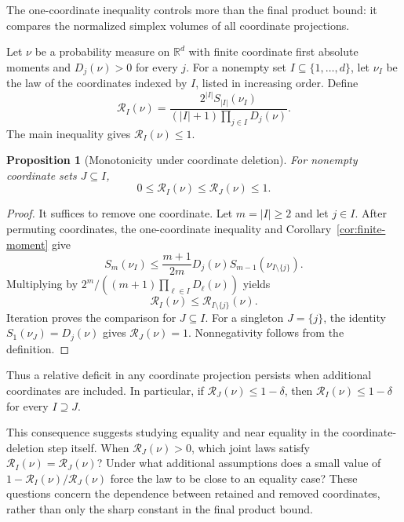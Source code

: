 \documentclass[11pt]{article}
\newtheorem{proposition}[theorem]{Proposition}
\theoremstyle{remark}
\newcommand{\R}{\mathbb{R}}
\begin{document}
\begin{humanblock}

The one-coordinate inequality controls more than the final
product bound: it compares the normalized simplex volumes
of all coordinate projections.

Let $\nu$ be a probability measure on $\R^d$ with finite
coordinate first absolute moments and $D_j(\nu)>0$ for
every $j$. For a nonempty set
$I\subseteq\{1,\ldots,d\}$, let $\nu_I$ be the law of the
coordinates indexed by $I$, listed in increasing order.
Define
$$
\mathcal{R}_I(\nu)=
\frac{2^{|I|}S_{|I|}(\nu_I)}
{(|I|+1)\prod_{j\in I}D_j(\nu)}.
$$
The main inequality gives $\mathcal{R}_I(\nu)\leq1$.

\begin{proposition}[Monotonicity under coordinate deletion]
For nonempty coordinate sets $J\subseteq I$,
$$
0\leq\mathcal{R}_I(\nu)\leq\mathcal{R}_J(\nu)\leq1.
$$
\end{proposition}

\begin{proof}
It suffices to remove one coordinate.
Let $m=|I|\geq2$ and let $j\in I$.
After permuting coordinates, the one-coordinate inequality
and Corollary~\ref{cor:finite-moment} give
$$
S_m(\nu_I)\leq
\frac{m+1}{2m}D_j(\nu)S_{m-1}(\nu_{I\setminus\{j\}}).
$$
Multiplying by
$2^m/((m+1)\prod_{\ell\in I}D_\ell(\nu))$
yields
$$
\mathcal{R}_I(\nu)\leq
\mathcal{R}_{I\setminus\{j\}}(\nu).
$$
Iteration proves the comparison for $J\subseteq I$.
For a singleton $J=\{j\}$, the identity
$S_1(\nu_J)=D_j(\nu)$ gives $\mathcal{R}_J(\nu)=1$.
Nonnegativity follows from the definition.
\end{proof}

Thus a relative deficit in any coordinate projection
persists when additional coordinates are included.
In particular, if $\mathcal{R}_J(\nu)\leq1-\delta$, then
$\mathcal{R}_I(\nu)\leq1-\delta$ for every $I\supseteq J$.

This consequence suggests studying equality and near equality
in the coordinate-deletion step itself.
When $\mathcal{R}_J(\nu)>0$, which joint laws satisfy
$\mathcal{R}_I(\nu)=\mathcal{R}_J(\nu)$?
Under what additional assumptions does a small value of
$1-\mathcal{R}_I(\nu)/\mathcal{R}_J(\nu)$ force the law
to be close to an equality case?
These questions concern the dependence between retained
and removed coordinates, rather than only the sharp
constant in the final product bound.

\end{humanblock}
\end{document}
